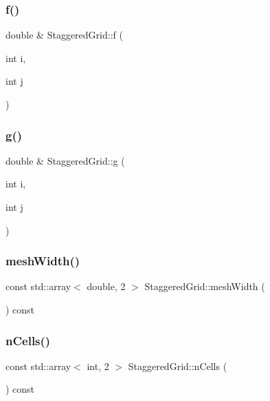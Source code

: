 \mbox{\label{classStaggeredGrid_adb05c59512dc8993367e4beddba05785}} 
\subsubsection{\texorpdfstring{f()}{f()}}
{\footnotesize\ttfamily double \& Staggered\+Grid\+::f (\begin{DoxyParamCaption}\item[{int}]{i,  }\item[{int}]{j }\end{DoxyParamCaption})}

\mbox{\label{classStaggeredGrid_aaf849bec40f7fa7c68823038f0877341}} 
\subsubsection{\texorpdfstring{g()}{g()}}
{\footnotesize\ttfamily double \& Staggered\+Grid\+::g (\begin{DoxyParamCaption}\item[{int}]{i,  }\item[{int}]{j }\end{DoxyParamCaption})}

\mbox{\label{classStaggeredGrid_a330856d4efe952771daf0753ef84068e}} 
\subsubsection{\texorpdfstring{meshWidth()}{meshWidth()}}
{\footnotesize\ttfamily const std\+::array$<$ double, 2 $>$ Staggered\+Grid\+::mesh\+Width (\begin{DoxyParamCaption}{ }\end{DoxyParamCaption}) const}

\mbox{\label{classStaggeredGrid_af37816ccb2c46e4a514dedac261897bf}} 
\subsubsection{\texorpdfstring{nCells()}{nCells()}}
{\footnotesize\ttfamily const std\+::array$<$ int, 2 $>$ Staggered\+Grid\+::n\+Cells (\begin{DoxyParamCaption}{ }\end{DoxyParamCaption}) const}

